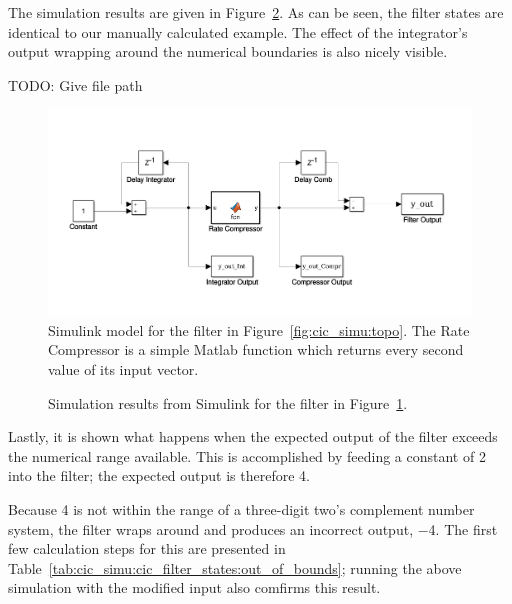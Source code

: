 The          simulation         results          are         given          in
Figure~\ref{fig:cic_simu:simulink_results}. As can be  seen, the filter states
are  identical  to   our  manually  calculated  example. The   effect  of  the
integrator's output  wrapping around the  numerical boundaries is  also nicely
visible.

TODO: Give file path

\begin{figure}
    \centering
    \includegraphics[width=\textwidth]{images/cicSimu/simulink.png}
    \caption[Simulink Filter Model]{%
        Simulink model  for the filter  in Figure~\ref{fig:cic_simu:topo}. The
        Rate   Compressor is  a  simple Matlab  function  which returns  every
        second value of its input vector.%
    }
    \label{fig:cic_simu:simulink_model}
\end{figure}

\begin{figure}
    \centering
    
    \caption[Simulink Simulation Results]{%
        Simulation    results    from    Simulink   for    the    filter    in
        Figure~\ref{fig:cic_simu:simulink_model}.%
    }
    \label{fig:cic_simu:simulink_results}
\end{figure}

Lastly,  it is  shown what  happens  when the  expected output  of the  filter
exceeds  the numerical  range  available. This is  accomplished  by feeding  a
constant of \num{2} into the filter; the expected output is therefore \num{4}.

Because \num{4}  is not  within the  range of  a three-digit  two's complement
number  system, the  filter wraps  around  and produces  an incorrect  output,
\num{-4}.   The  first  few  calculation  steps  for  this  are  presented  in
Table~\ref{tab:cic_simu:cic_filter_states:out_of_bounds};  running  the  above
simulation with the modified input also comfirms this result.

